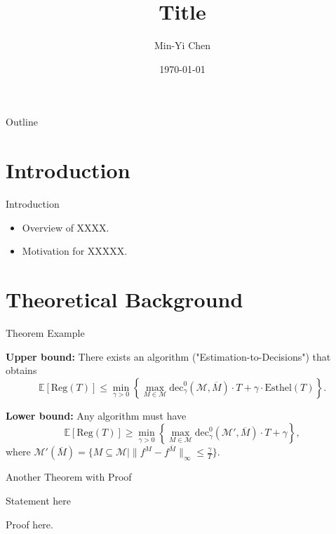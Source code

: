 \documentclass{beamer}
\author{Min-Yi Chen}
\institute[ISU]{Department of Statistics}
\title{Title}
\date{\today}
\begin{document}
\frame{\maketitle}

\begin{frame}{Outline}
    \tableofcontents
\end{frame}

\section{Introduction}
\begin{frame}{Introduction}
    \begin{itemize}
        \item Overview of XXXX.
        \item Motivation for XXXXX.
    \end{itemize}
\end{frame}

\section{Theoretical Background}

\begin{frame}{Theorem Example}
    \begin{mytheorem}
        \textbf{Upper bound:} There exists an algorithm ("Estimation-to-Decisions") that obtains
        \[
        \mathbb{E}[\text{Reg}(T)] \leq \min_{\gamma > 0} \left\{ \max_{M \in \mathcal{M}} \text{dec}_\gamma^0(\mathcal{M}, \overline{M}) \cdot T + \gamma \cdot \text{Esthel}(T) \right\}.
        \]
        
        \textbf{Lower bound:} Any algorithm must have
        \[
        \mathbb{E}[\text{Reg}(T)] \geq \min_{\gamma > 0} \left\{ \max_{M \in \mathcal{M}} \text{dec}_\gamma^0(\mathcal{M}', \overline{M}) \cdot T + \gamma \right\},
        \]
        where \(\mathcal{M}'(\overline{M}) = \{ M \subseteq \mathcal{M} \mid \|f^M - f^{\overline{M}}\|_\infty \leq \frac{\gamma}{T}\}\).
    \end{mytheorem}
\end{frame}

\begin{frame}{Another Theorem with Proof}
    \begin{mytheorem}[ (Example)]
        Statement here
    \end{mytheorem}

    \begin{myproof}
        Proof here.
    \end{myproof}
\end{frame}
\end{document}
